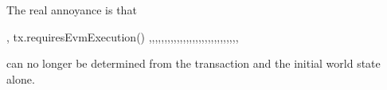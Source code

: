 	The real annoyance is that

	,   tx.requiresEvmExecution()
	,,,,,,,,,,,,,,,,,,,,,,,,,,,,,

	can no longer be determined from the transaction and the initial world state alone.
	\fi

